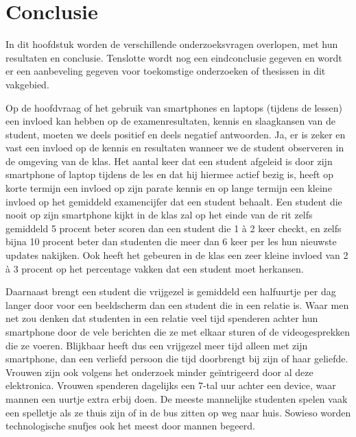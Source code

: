 
\chapter{Conclusie}
\label{ch:conclusie}



In dit hoofdstuk worden de verschillende onderzoeksvragen overlopen, met hun resultaten en conclusie. Tenslotte wordt nog een eindconclusie gegeven en wordt er een aanbeveling gegeven voor toekomstige onderzoeken of thesissen in dit vakgebied.

Op de hoofdvraag of het gebruik van smartphones en laptops (tijdens de lessen) een invloed kan hebben op de examenresultaten, kennis en slaagkansen van de student, moeten we deels positief en deels negatief antwoorden. Ja, er is zeker en vast een invloed op de kennis en resultaten wanneer we de student observeren in de omgeving van de klas. Het aantal keer dat een student afgeleid is door zijn smartphone of laptop tijdens de les en dat hij hiermee actief bezig is, heeft op korte termijn een invloed op zijn parate kennis en op lange termijn een kleine invloed op het gemiddeld examencijfer dat een student behaalt. Een student die nooit op zijn smartphone kijkt in de klas zal op het einde van de rit zelfs gemiddeld 5 procent beter scoren dan een student die 1 à 2 keer checkt, en zelfs bijna 10 procent beter dan studenten die meer dan 6 keer per les hun nieuwste updates nakijken. Ook heeft het gebeuren in de klas een zeer kleine invloed van 2 à 3 procent op het percentage vakken dat een student moet herkansen.

Daarnaast brengt een student die vrijgezel is gemiddeld een halfuurtje per dag langer door voor een beeldscherm dan een student die in een relatie is. Waar men net zou denken dat studenten in een relatie veel tijd spenderen achter hun smartphone door de vele berichten die ze met elkaar sturen of de videogesprekken die ze voeren. Blijkbaar heeft dus een vrijgezel meer tijd alleen met zijn smartphone, dan een verliefd persoon die tijd doorbrengt bij zijn of haar geliefde. Vrouwen zijn ook volgens het onderzoek minder geïntrigeerd door al deze elektronica. Vrouwen spenderen dagelijks een 7-tal uur achter een device, waar mannen een uurtje extra erbij doen. De meeste mannelijke studenten spelen vaak een spelletje als ze thuis zijn of in de bus zitten op weg naar huis. Sowieso worden technologische snufjes ook het meest door mannen begeerd.

